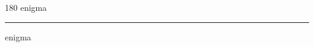 
\begin{frame}
\begin{center}
\begin{turn}{180}
{\fontsize{2.5cm}{1em}\selectfont enigma}
\end{turn}
\vspace{1em}\par  
\hrule
\vspace{1em}\par  
{\fontsize{2.5cm}{1em}\selectfont enigma}
\end{center}
\end{frame}
